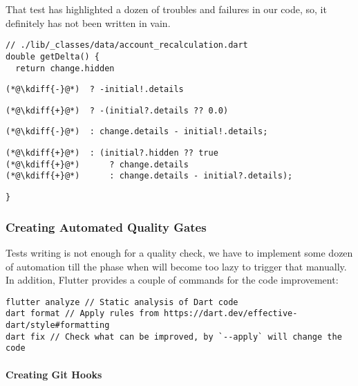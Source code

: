 \noindent That test has highlighted a dozen of troubles and failures in our code, so, it definitely has not been 
written in vain.

\begin{lstlisting}[firstnumber=17]
// ./lib/_classes/data/account_recalculation.dart
double getDelta() {
  return change.hidden
\end{lstlisting}
{
\xpretocmd{\lstlisting}{\vspace{-12pt}}{}{}
\begin{lstlisting}[firstnumber=20, backgroundcolor=\color{backred}]
(*@\kdiff{-}@*)  ? -initial!.details
\end{lstlisting}
\begin{lstlisting}[firstnumber=20, backgroundcolor=\color{backgreen}]
(*@\kdiff{+}@*)  ? -(initial?.details ?? 0.0)
\end{lstlisting}
\begin{lstlisting}[firstnumber=21, backgroundcolor=\color{backred}]
(*@\kdiff{-}@*)  : change.details - initial!.details;
\end{lstlisting}
\begin{lstlisting}[firstnumber=21, backgroundcolor=\color{backgreen}]
(*@\kdiff{+}@*)  : (initial?.hidden ?? true
(*@\kdiff{+}@*)      ? change.details
(*@\kdiff{+}@*)      : change.details - initial?.details);
\end{lstlisting}
\begin{lstlisting}[firstnumber=24]
}
\end{lstlisting}
}

\subsubsection{Creating Automated Quality Gates}

Tests writing is not enough for a quality check, we have to implement some dozen of automation till the phase 
when will become too lazy to trigger that manually. In addition, Flutter provides a couple of commands for the 
code improvement:
\begin{lstlisting}
flutter analyze // Static analysis of Dart code
dart format // Apply rules from https://dart.dev/effective-dart/style#formatting
dart fix // Check what can be improved, by `--apply` will change the code
\end{lstlisting}

\paragraph{Creating Git Hooks}

